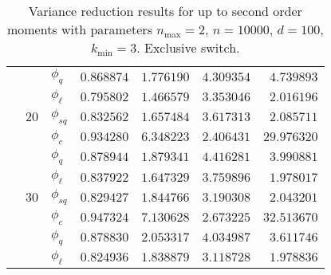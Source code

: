 \begin{table}[htb]
{\begin{tabular}{l@{\hskip 12pt}l@{\hskip 12pt}l@{\hskip 12pt}r@{\hskip 12pt}r@{\hskip 12pt}r@{\hskip 12pt}r}
            &    &$\phi_{q}$ &  $0.868874$ &  $1.776190$ &    $4.309354$ &   $4.739893$ \\
            &    & $\phi_{\ell}$ &  $0.795802$ &  $1.466579$ &    $3.353046$ &   $2.016196$ \\\cmidrule{2-7}
            & $20$ &$\phi_{sq}$ &  $0.832562$ &  $1.657484$ &    $3.617313$ &   $2.085711$ \\
            &    &$\phi_{c}$ &  $0.934280$ &  $6.348223$ &    $2.406431$ &  $29.976320$ \\
            &    &$\phi_{q}$ &  $0.878944$ &  $1.879341$ &    $4.416281$ &   $3.990881$ \\
            &    & $\phi_{\ell}$ &  $0.837922$ &  $1.647329$ &    $3.759896$ &   $1.978017$ \\\cmidrule{2-7}
            & $30$ &$\phi_{sq}$ &  $0.829427$ &  $1.844766$ &    $3.190308$ &   $2.043201$ \\
            &    &$\phi_{c}$ &  $0.947324$ &  $7.130628$ &    $2.673225$ &  $32.513670$ \\
            &    &$\phi_{q}$ &  $0.878830$ &  $2.053317$ &    $4.034987$ &   $3.611746$ \\
            &    & $\phi_{\ell}$ &  $0.824936$ &  $1.838879$ &    $3.118728$ &   $1.978836$ \\
\bottomrule
\end{tabular}}
    \caption[Variance reduction results for up to second order moments]{Variance reduction results for up to second order moments with parameters $n_{\max}=2$, $n=\num{10000}$, $d=100$, $k_{\min}=3$. Exclusive switch.}
    \label{tab:eff1}
\end{table}

